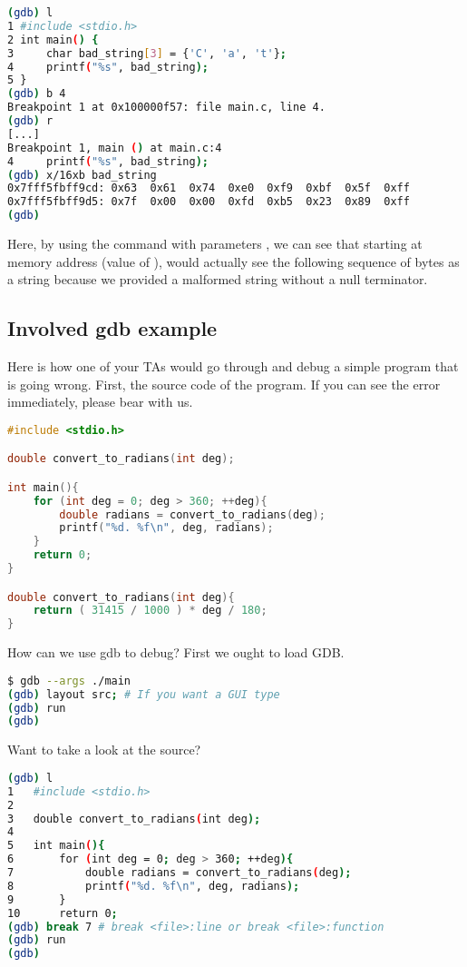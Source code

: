 \begin{lstlisting}[language=bash]
(gdb) l
1 #include <stdio.h>
2 int main() {
3     char bad_string[3] = {'C', 'a', 't'};
4     printf("%s", bad_string);
5 }
(gdb) b 4
Breakpoint 1 at 0x100000f57: file main.c, line 4.
(gdb) r
[...]
Breakpoint 1, main () at main.c:4
4     printf("%s", bad_string);
(gdb) x/16xb bad_string
0x7fff5fbff9cd: 0x63  0x61  0x74  0xe0  0xf9  0xbf  0x5f  0xff
0x7fff5fbff9d5: 0x7f  0x00  0x00  0xfd  0xb5  0x23  0x89  0xff
(gdb)
\end{lstlisting}

Here, by using the  command with parameters , we can see that starting at memory address  (value of ),  would actually see the following sequence of bytes as a string because we provided a malformed string without a null terminator.

\subsection{Involved gdb example}

Here is how one of your TAs would go through and debug a simple program that is going wrong.
First, the source code of the program.
If you can see the error immediately, please bear with us.

\begin{lstlisting}[language=C]
#include <stdio.h>

double convert_to_radians(int deg);

int main(){
	for (int deg = 0; deg > 360; ++deg){
		double radians = convert_to_radians(deg);
		printf("%d. %f\n", deg, radians);
	}
	return 0;
}

double convert_to_radians(int deg){
	return ( 31415 / 1000 ) * deg / 180;
}
\end{lstlisting}

How can we use gdb to debug? First we ought to load GDB.

\begin{lstlisting}[language=bash]
$ gdb --args ./main
(gdb) layout src; # If you want a GUI type
(gdb) run
(gdb)
\end{lstlisting}

Want to take a look at the source?

\begin{lstlisting}[language=bash]
(gdb) l
1	#include <stdio.h>
2	
3	double convert_to_radians(int deg);
4	
5	int main(){
6		for (int deg = 0; deg > 360; ++deg){
7			double radians = convert_to_radians(deg);
8			printf("%d. %f\n", deg, radians);
9		}
10	    return 0;
(gdb) break 7 # break <file>:line or break <file>:function
(gdb) run
(gdb)
\end{lstlisting}


